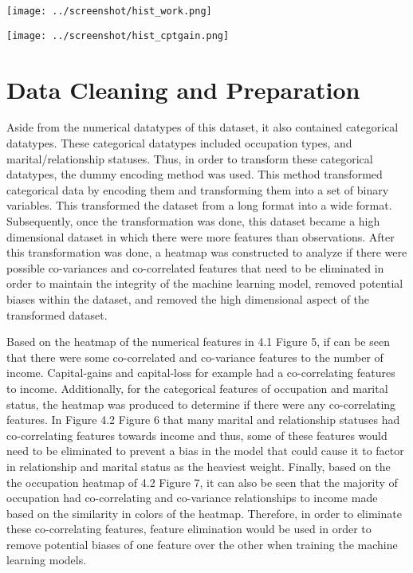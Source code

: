 \documentclass[12pt]{article}
\begin{document}
\begin{multicols*}{2}
\begin{center}
	\texttt{[image: ../screenshot/hist\_work.png]}


	\texttt{[image: ../screenshot/hist\_cptgain.png]}
  \end{center}




\section{Data Cleaning and Preparation}


\hspace*{5mm} Aside from the numerical datatypes of this dataset, it also contained categorical datatypes. These categorical datatypes included occupation types, and marital/relationship statuses.
Thus, in order to transform these categorical datatypes, the dummy encoding method was used. This method transformed categorical data by encoding them and transforming them into a set of binary variables.
This transformed the dataset from a long format into a wide format. Subsequently, once the transformation was done, this dataset became a high dimensional dataset in which there were more features than observations.
After this transformation was done, a heatmap was constructed to analyze if there were possible co-variances and co-correlated features that 
need to be eliminated in order to maintain the integrity of the machine learning model, removed potential biases within the dataset, and removed the high dimensional aspect of the transformed dataset. 


\hspace*{5mm} Based on the heatmap of the numerical features in 4.1 Figure 5, if can be seen that there were some co-correlated and co-variance features to the number of income. Capital-gains and capital-loss 
for example had a co-correlating features to income. Additionally, for the categorical features of occupation and marital status, the heatmap was produced to determine if there were any co-correlating features. In
Figure 4.2 Figure 6 that many marital and relationship statuses had co-correlating features towards income and thus, some of these features would need to be eliminated to prevent a bias in the model that could cause 
it to factor in relationship and marital status as the heaviest weight. Finally, based on the the occupation heatmap of 4.2 Figure 7, it can also be seen that the majority of occupation had co-correlating and co-variance relationships
to income made based on the similarity in colors of the heatmap. Therefore, in order to eliminate these co-correlating features, feature elimination would be used in order to remove potential
biases of one feature over the other when training the machine learning models. 


\end{multicols*}
\end{document}
